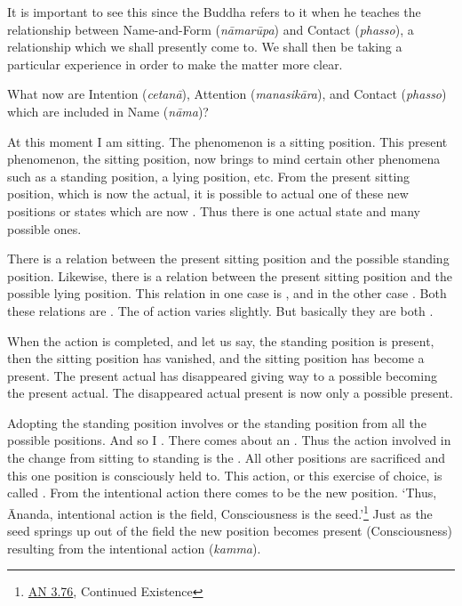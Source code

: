 It is important to see this since the Buddha refers to it when he teaches the relationship between Name-and-Form (\emph{nāmarūpa}) and Contact (\emph{phasso}), a relationship which we shall presently come to. We shall then be taking a particular experience in order to make the matter more clear.

What now are Intention (\emph{cetanā}), Attention (\emph{manasikāra}), and Contact (\emph{phasso}) which are included in Name (\emph{nāma})?

At this moment I am sitting. The  phenomenon is a sitting position. This present phenomenon, the sitting position, now brings to mind certain other phenomena such as a standing position, a lying position, etc. From the present sitting position, which is now the actual, it is possible to  actual one of these new positions or states which are now . Thus there is one actual state and many possible ones.

There is a relation between the present sitting position and the possible standing position. Likewise, there is a relation between the present sitting position and the possible lying position. This relation in one case is , and in the other case . Both these relations are . The  of action varies slightly. But basically they are both .

When the action is completed, and let us say, the standing position is present, then the sitting position has vanished, and the sitting position has become a  present. The present actual has disappeared giving way to a possible becoming the present actual. The disappeared actual present is now only a possible present.

Adopting the standing position involves  or  the standing position from all the possible positions. And so I . There comes about an . Thus the action involved in the change from sitting to standing is the . All other positions are sacrificed and this one position is consciously held to. This action, or this exercise of choice, is called . From the intentional action there comes to be  the new position. `Thus, Ānanda, intentional action is the field, Consciousness is the seed.'\footnote{\href{https://suttacentral.net/an3.76/en/thanissaro}{AN 3.76}, Continued Existence} Just as the seed springs up out of the field the new position becomes present (Consciousness) resulting from the intentional action (\emph{kamma}).

